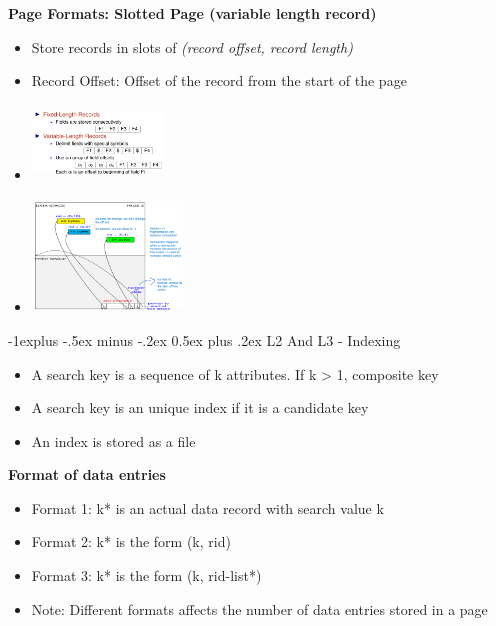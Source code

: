 \documentclass[10pt, landscape]{article}
\makeatletter
\renewcommand{\subsection}{\@startsection{subsection}{2}{0mm}%
                                {-1explus -.5ex minus -.2ex}%
                                {0.5ex plus .2ex}%
                                {\normalfont\normalsize\bfseries}}
\makeatother
\begin{document}
\begin{multicols}{4}
\textbf{Page Formats: Slotted Page (variable length record)}
\begin{itemize}
  \item Store records in slots of \textsl{(record offset, record length)}
  \item Record Offset: Offset of the record from the start of the page
\end{itemize}

\begin{multicols}{2}
  \begin{itemize}
    \item \includegraphics[width=3.5cm, height=2cm]{var_record.png}
  \end{itemize}  
  \begin{itemize}
    \item \includegraphics*[width=4cm, height=3cm]{slot_page.png}
  \end{itemize}
\end{multicols}


\subsection{L2 And L3 - Indexing}
\begin{itemize}
  \item A search key is a sequence of k attributes. If k > 1, composite key
  \item A search key is an unique index if it is a candidate key
  \item An index is stored as a file
\end{itemize}

\textbf{Format of data entries}
\begin{itemize}
  \item Format 1: k* is an actual data record with search value k
  \item Format 2: k* is the form (k, rid)
  \item Format 3: k* is the form (k, rid-list*)
  \item Note: Different formats affects the number of data entries stored in a page
\end{itemize}


\end{multicols}
\end{document}
